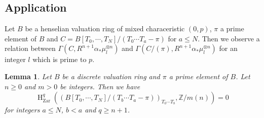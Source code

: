 \documentclass{article}
\newtheorem{lem}[thm]{\indent \sc Lemma}
\newcommand{\Zar}{\mathrm{Zar}}
\newcommand{\HO}{\operatorname{H}}
\begin{document}
\subsection{Application}
Let $B$ be a henselian valuation ring of mixed characeristic $(0, p)$,
$\pi$ a prime element of $B$ 
and $C=B[T_{0}, \cdots, T_{N}]/(T_{0}\cdots T_{a}-\pi)$
for $a\leq N$. Then we observe a relation between
$\Gamma\left(C, R^{n+1}\alpha_{*}\mu_{l}^{\otimes n}\right)$
and
$\Gamma\left(C/(\pi), R^{n+1}\alpha_{*}\mu_{l}^{\otimes n}\right)$
for an integer $l$ which is prime to $p$.
%
\begin{lem}\upshape\label{Vanis}
Let $B$ be a discrete valuation ring and $\pi$ a prime element of $B$.
Let $n\geq 0$ and $m>0$ be integers.
Then we have
%
\begin{equation*}
\HO^{q}_{\Zar}\left(
(
B[T_{0}, \cdots, T_{N}]/
(
T_{b}\cdots T_{a}-\pi
)
)_{T_{0}\cdots T_{b}},
\mathbb{Z}/m(n)
\right)
=0
\end{equation*}
%
for integers $a\leq N$, $b<a$ and $q\geq n+1$.
\end{lem}
%
\end{document}
